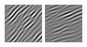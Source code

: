 \begin{figure}[ht]
\begin{center}
  \includegraphics[width=\columnwidth/9]{ch4/figures/real_1_2.jpg}
  \includegraphics[width=\columnwidth/9]{ch4/figures/real_1_3.jpg}

\end{center}
\end{figure}
